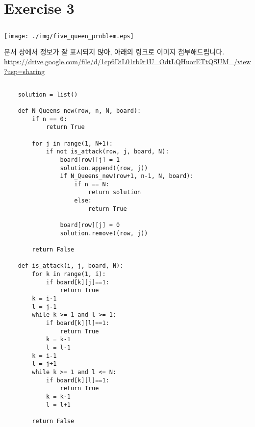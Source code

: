 \documentclass{article}
\begin{document}
\section{Exercise 3}
\subsection{}
\begin{center}
    \texttt{[image: ./img/five\_queen\_problem.eps]}
\end{center}
문서 상에서 정보가 잘 표시되지 않아, 아래의 링크로 이미지 첨부해드립니다.
\url{https://drive.google.com/file/d/1cp6DiL01rb9r1U_OdtLQHuorETtQSUM_/view?usp=sharing}

\subsection{}
\begin{lstlisting}
    solution = list()

    def N_Queens_new(row, n, N, board):
        if n == 0:
            return True
    
        for j in range(1, N+1):
            if not is_attack(row, j, board, N):
                board[row][j] = 1
                solution.append((row, j))
                if N_Queens_new(row+1, n-1, N, board):
                    if n == N:
                        return solution
                    else:
                        return True
    
                board[row][j] = 0
                solution.remove((row, j))
    
        return False
    
    def is_attack(i, j, board, N):
        for k in range(1, i):
            if board[k][j]==1:
                return True
        k = i-1
        l = j-1
        while k >= 1 and l >= 1:
            if board[k][l]==1:
                return True
            k = k-1
            l = l-1
        k = i-1
        l = j+1
        while k >= 1 and l <= N:
            if board[k][l]==1:
                return True
            k = k-1
            l = l+1
    
        return False
\end{lstlisting}
\end{document}
